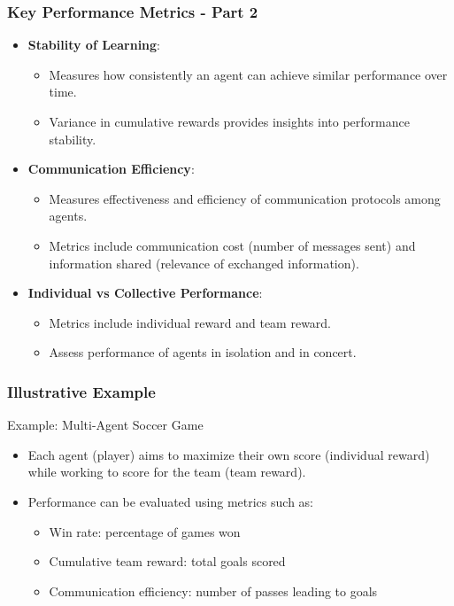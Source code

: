 \documentclass[aspectratio=169]{beamer}
\begin{document}
\begin{frame}[fragile]
    \frametitle{Key Performance Metrics - Part 2}
    \begin{itemize}
        \item \textbf{Stability of Learning}:
            \begin{itemize}
                \item Measures how consistently an agent can achieve similar performance over time.
                \item Variance in cumulative rewards provides insights into performance stability.
            \end{itemize}
        
        \item \textbf{Communication Efficiency}:
            \begin{itemize}
                \item Measures effectiveness and efficiency of communication protocols among agents.
                \item Metrics include communication cost (number of messages sent) and information shared (relevance of exchanged information).
            \end{itemize}
        
        \item \textbf{Individual vs Collective Performance}:
            \begin{itemize}
                \item Metrics include individual reward and team reward.
                \item Assess performance of agents in isolation and in concert.
            \end{itemize}
    \end{itemize}
\end{frame}

\begin{frame}[fragile]
    \frametitle{Illustrative Example}
    \begin{block}{Example: Multi-Agent Soccer Game}
        \begin{itemize}
            \item Each agent (player) aims to maximize their own score (individual reward) while working to score for the team (team reward).
            \item Performance can be evaluated using metrics such as:
                \begin{itemize}
                    \item Win rate: percentage of games won
                    \item Cumulative team reward: total goals scored
                    \item Communication efficiency: number of passes leading to goals
                \end{itemize}
        \end{itemize}
    \end{block}
\end{frame}
\end{document}
